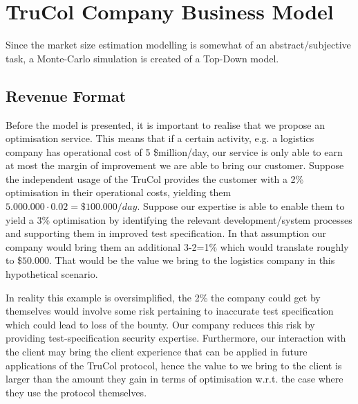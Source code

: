 \section{TruCol Company Business Model}\label{sec:trucol_company_business_model}
Since the market size estimation modelling is somewhat of an abstract/subjective task, a Monte-Carlo simulation is created of a Top-Down model.

\subsection{Revenue Format}
Before the model is presented, it is important to realise that we propose an optimisation service. This means that if a certain activity, e.g. a logistics company has operational cost of 5 \$million/day, our service is only able to earn at most the margin of improvement we are able to bring our customer. Suppose the independent usage of the TruCol provides the customer with a 2\% optimisation in their operational costs, yielding them $5.000.000\cdot 0.02=\$100.000/day$. Suppose our expertise is able to enable them to yield a 3\% optimisation by identifying the relevant development/system processes and supporting them in improved test specification. In that assumption our company would bring them an additional 3-2=1\% which would translate roughly to \$$50.000$. That would be the value we bring to the logistics company in this hypothetical scenario.

In reality this example is oversimplified, the 2\% the company could get by themselves would involve some risk pertaining to inaccurate test specification which could lead to loss of the bounty. Our company reduces this risk by providing test-specification security expertise. Furthermore, our interaction with the client may bring the client experience that can be applied in future applications of the TruCol protocol, hence the value to we bring to the client is larger than the amount they gain in terms of optimisation w.r.t. the case where they use the protocol themselves.
